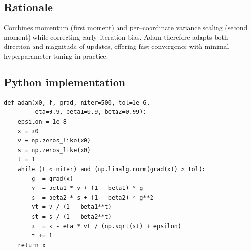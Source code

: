 \documentclass[12pt]{article}
\begin{document}
\subsection*{Rationale}
Combines momentum (first moment) and per--coordinate variance scaling (second
moment) while correcting early--iteration bias.  Adam therefore adapts both
direction and magnitude of updates, offering fast convergence with minimal
hyperparameter tuning in practice.

\subsection*{Python implementation}
\begin{lstlisting}
def adam(x0, f, grad, niter=500, tol=1e-6,
         eta=0.9, beta1=0.9, beta2=0.99):
    epsilon = 1e-8
    x = x0
    v = np.zeros_like(x0)
    s = np.zeros_like(x0)
    t = 1
    while (t < niter) and (np.linalg.norm(grad(x)) > tol):
        g  = grad(x)
        v  = beta1 * v + (1 - beta1) * g
        s  = beta2 * s + (1 - beta2) * g**2
        vt = v / (1 - beta1**t)
        st = s / (1 - beta2**t)
        x  = x - eta * vt / (np.sqrt(st) + epsilon)
        t += 1
    return x
\end{lstlisting}
\end{document}
